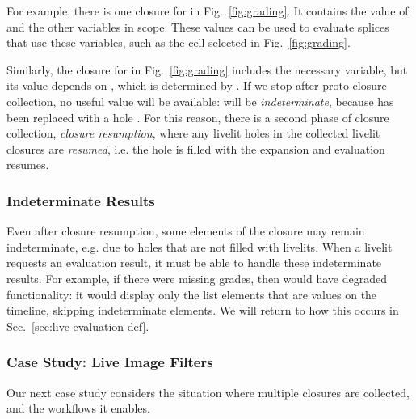 For example, there is one closure for  in Fig.~\ref{fig:grading}.
It contains the value of  and the other variables in scope.
These values can be used to evaluate
splices that use these variables, such as the cell selected in Fig.~\ref{fig:grading}.

Similarly, the closure for  in Fig.~\ref{fig:grading} includes
the necessary  variable, but
its value depends on , which is determined by .
If we stop after proto-closure collection,
no useful value will be available:
 will be \emph{indeterminate}, because  has been replaced with a hole \cite{HazelnutLive}.
For this reason, there is a second phase of closure collection, \emph{closure resumption},
where any livelit holes
in the collected livelit closures are \emph{resumed}, i.e. the hole is filled with the expansion
 and evaluation resumes.


\subsubsection{Indeterminate Results}
Even after closure resumption, some elements of the closure may remain indeterminate, e.g. due to holes that
are not filled with livelits.
When a livelit requests an evaluation result, it must be able to handle these indeterminate results.
For example, if there were missing grades,
then  would have degraded functionality:
it would display only the list elements that are values on the timeline, skipping indeterminate elements.
We will return to how this occurs in Sec.~\ref{sec:live-evaluation-def}.



\subsubsection{Case Study: Live Image Filters}\label{sec:image-transformation}
Our next case study
considers the situation where multiple closures are collected, and
the workflows it enables.

